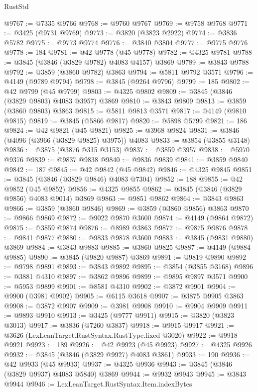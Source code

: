 \begin{lexlean}{RustStd}
\begin{coremodule}
@9767 := @7335 @9766
@9768 := @9760 @9767
@9769 := @9758 @9768
@9771 := @3425 (@9731 @9769)
@9773 := @3820 (@3823 @2922)
@9774 := @3836 @5782
@9775 := @9773 @9774
@9776 := @3840 @3804
@9777 := @9775 @9776
@9778 := 184
@9781 := @42 @9778 (@45 @9778)
@9782 := @4325 @9781
@9788 := @3845 (@3846 (@3829 @9782) @4083 @4157) @3869
@9789 := @3843 @9788
@9792 := @3859 (@3860 @9782) @3863
@9794 := @5811 @9792 @3571
@9796 := @4149 (@9789 @9794)
@9798 := @3845 (@9264 @9796)
@9799 := 185
@9802 := @42 @9799 (@45 @9799)
@9803 := @4325 @9802
@9809 := @3845 (@3846 (@3829 @9803) @4083 @3957) @3869
@9810 := @3843 @9809
@9813 := @3859 (@3860 @9803) @3863
@9815 := @5811 @9813 @3571
@9817 := @4149 (@9810 @9815)
@9819 := @3845 (@5866 @9817)
@9820 := @5898 @5799
@9821 := 186
@9824 := @42 @9821 (@45 @9821)
@9825 := @3968 @9824
@9831 := @3846 (@4096 (@3966 (@3829 @9825) @3975)) @4083
@9833 := @3854 (@3855 @3148)
@9836 := @3875 (@3876 @315 @3153)
@9837 := @3859 @3957
@9838 := @5970 @9376
@9839 := @9837 @9838
@9840 := @9836 @9839
@9841 := @3859 @9840
@9842 := 187
@9845 := @42 @9842 (@45 @9842)
@9846 := @4325 @9845
@9851 := @3845 (@3846 (@3829 @9846) @4083 @7304)
@9852 := 188
@9855 := @42 @9852 (@45 @9852)
@9856 := @4325 @9855
@9862 := @3845 (@3846 (@3829 @9856) @4083 @9014) @3869
@9863 := @9851 @9862
@9864 := @3843 @9863
@9866 := @3859 (@3860 @9846)
@9869 := @3859 (@3860 @9856) @3863
@9870 := @9866 @9869
@9872 := @9022 @9870 @3600
@9874 := @4149 (@9864 @9872)
@9875 := @3859 @9874
@9876 := @8989 @3863
@9877 := @9875 @9876
@9878 := @9841 @9877
@9880 := @9833 @9878 @3600
@9883 := @3845 (@9831 @9880) @3869
@9884 := @3843 @9883
@9885 := @3860 @9825
@9887 := @4149 (@9884 @9885)
@9890 := @3845 (@9820 @9887) @3869
@9891 := @9819 @9890
@9892 := @9798 @9891
@9893 := @3843 @9892
@9895 := @3854 (@3855 @3168)
@9896 := @3881 @4310
@9897 := @3862 @9896
@9899 := @9895 @9897 @3571
@9900 := @5953 @9899
@9901 := @8581 @4310
@9902 := @3872 @9901
@9904 := @9900 (@3981 @9902)
@9905 := @6115 @3618
@9907 := @3875 @9905 @3863
@9908 := @3872 @9907
@9909 := @3981 @9908
@9910 := @9904 @9909
@9911 := @9893 @9910
@9913 := @3425 (@9777 @9911)
@9915 := @3820 (@3823 @3013)
@9917 := @3836 (@7260 @3837)
@9918 := @9915 @9917
@9921 := @3626 (LexLeanTarget.RustSyntax.RustType.fixed @3020)
@9922 := @9918 @9921
@9923 := 189
@9926 := @42 @9923 (@45 @9923)
@9927 := @4325 @9926
@9932 := @3845 (@3846 (@3829 @9927) @4083 @3861)
@9933 := 190
@9936 := @42 @9933 (@45 @9933)
@9937 := @4325 @9936
@9943 := @3845 (@3846 (@3829 @9937) @4083 @5840) @3869
@9944 := @9932 @9943
@9945 := @3843 @9944
@9946 := LexLeanTarget.RustSyntax.Item.indexBytes

\end{coremodule}
\end{lexlean}
